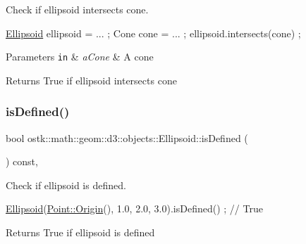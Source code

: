 Check if ellipsoid intersects cone. 


\begin{DoxyCode}
\hyperlink{classostk_1_1math_1_1geom_1_1d3_1_1objects_1_1_ellipsoid_acd84276f65a14db12623402a411712b7}{Ellipsoid} ellipsoid = ... ;
Cone cone = ... ;
ellipsoid.intersects(cone) ;
\end{DoxyCode}



\begin{DoxyParams}[1]{Parameters}
\mbox{\tt in}  & {\em a\+Cone} & A cone \\
\hline
\end{DoxyParams}
\begin{DoxyReturn}{Returns}
True if ellipsoid intersects cone 
\end{DoxyReturn}
\mbox{\label{classostk_1_1math_1_1geom_1_1d3_1_1objects_1_1_ellipsoid_a21c465d185052a1631fe3ddcc131512d}} 
\subsubsection{\texorpdfstring{is\+Defined()}{isDefined()}}
{\footnotesize\ttfamily bool ostk\+::math\+::geom\+::d3\+::objects\+::\+Ellipsoid\+::is\+Defined (\begin{DoxyParamCaption}{ }\end{DoxyParamCaption}) const\hspace{0.3cm}{\ttfamily [override]}, {\ttfamily [virtual]}}



Check if ellipsoid is defined. 


\begin{DoxyCode}
\hyperlink{classostk_1_1math_1_1geom_1_1d3_1_1objects_1_1_ellipsoid_acd84276f65a14db12623402a411712b7}{Ellipsoid}(\hyperlink{classostk_1_1math_1_1geom_1_1d3_1_1objects_1_1_point_a079c199f08b015d456d02728a71b534c}{Point::Origin}(), 1.0, 2.0, 3.0).isDefined() ; \textcolor{comment}{// True}
\end{DoxyCode}


\begin{DoxyReturn}{Returns}
True if ellipsoid is defined 
\end{DoxyReturn}


